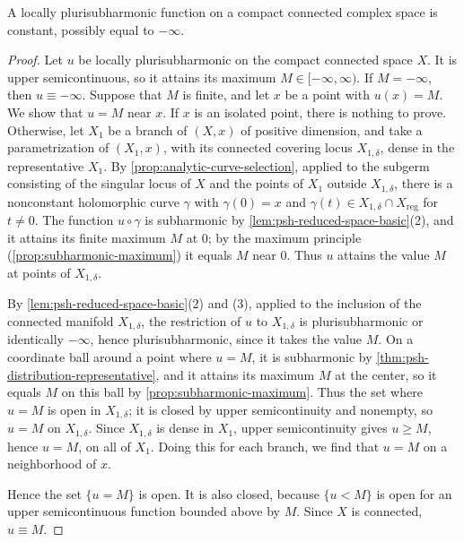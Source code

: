 \begin{proposition}\label{prop:psh-compact-connected-constant}
A locally plurisubharmonic function on a compact connected complex space is constant, possibly equal to $-\infty$.
\end{proposition}
\begin{proof}
Let $u$ be locally plurisubharmonic on the compact connected space $X$. It is upper semicontinuous, so it attains its maximum $M\in[-\infty,\infty)$. If $M=-\infty$, then $u\equiv-\infty$. Suppose that $M$ is finite, and let $x$ be a point with $u(x)=M$. We show that $u=M$ near $x$. If $x$ is an isolated point, there is nothing to prove. Otherwise, let $X_1$ be a branch of $(X,x)$ of positive dimension, and take a parametrization of $(X_1,x)$, with its connected covering locus $X_{1,\delta}$, dense in the representative $X_1$. By \cref{prop:analytic-curve-selection}, applied to the subgerm consisting of the singular locus of $X$ and the points of $X_1$ outside $X_{1,\delta}$, there is a nonconstant holomorphic curve $\gamma$ with $\gamma(0)=x$ and $\gamma(t)\in X_{1,\delta}\cap X_{\mathrm{reg}}$ for $t\neq0$. The function $u\circ\gamma$ is subharmonic by \cref{lem:psh-reduced-space-basic}(2), and it attains its finite maximum $M$ at $0$; by the maximum principle (\cref{prop:subharmonic-maximum}) it equals $M$ near $0$. Thus $u$ attains the value $M$ at points of $X_{1,\delta}$.

By \cref{lem:psh-reduced-space-basic}(2) and (3), applied to the inclusion of the connected manifold $X_{1,\delta}$, the restriction of $u$ to $X_{1,\delta}$ is plurisubharmonic or identically $-\infty$, hence plurisubharmonic, since it takes the value $M$. On a coordinate ball around a point where $u=M$, it is subharmonic by \cref{thm:psh-distribution-representative}, and it attains its maximum $M$ at the center, so it equals $M$ on this ball by \cref{prop:subharmonic-maximum}. Thus the set where $u=M$ is open in $X_{1,\delta}$; it is closed by upper semicontinuity and nonempty, so $u=M$ on $X_{1,\delta}$. Since $X_{1,\delta}$ is dense in $X_1$, upper semicontinuity gives $u\geq M$, hence $u=M$, on all of $X_1$. Doing this for each branch, we find that $u=M$ on a neighborhood of $x$.

Hence the set $\{u=M\}$ is open. It is also closed, because $\{u<M\}$ is open for an upper semicontinuous function bounded above by $M$. Since $X$ is connected, $u\equiv M$.
\end{proof}

